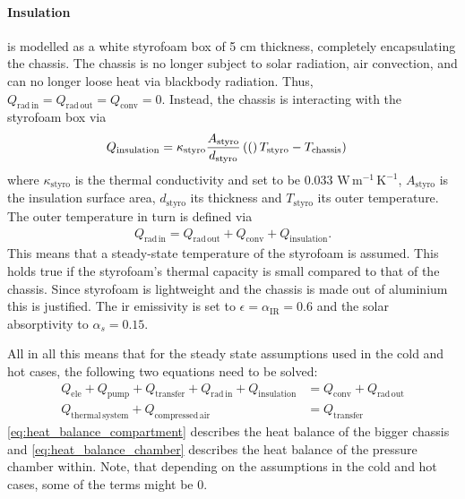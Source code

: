 \paragraph{Insulation} is modelled as a white styrofoam box of 5 cm thickness, completely encapsulating the chassis. The chassis is no longer subject to solar radiation, air convection, and can no longer loose heat via blackbody radiation. Thus, $Q_\mathrm{rad\,in}=Q_\mathrm{rad\,out}=Q_\mathrm{conv}=0$. Instead, the chassis is interacting with the styrofoam box via 
\begin{align}
    Q_\mathrm{insulation}=\kappa_\mathrm{styro}\frac{A_\mathrm{styro}}{d_\mathrm{styro}}\left( ( \right)T_\mathrm{styro}-T_\mathrm{chassis})\quad
\end{align} 
where $\kappa_\mathrm{styro}$ is the thermal conductivity and set to be 0.033 $\mathrm{W\,m^{-1}\,K^{-1}}$, $A_\mathrm{styro}$ is the insulation surface area, $d_\mathrm{styro}$ its thickness and $T_\mathrm{styro}$ its outer temperature. The outer temperature in turn is defined via 
\begin{align}
    Q_\mathrm{rad\,in} = Q_\mathrm{rad\,out}+Q_\mathrm{conv} + Q_\mathrm{insulation}.
\end{align}
This means that a steady-state temperature of the styrofoam is assumed. This holds true if the styrofoam's thermal capacity is small compared to that of the chassis. Since styrofoam is lightweight and the chassis is made out of aluminium this is justified.
The \gls{ir} emissivity is set to $\epsilon=\alpha_\mathrm{IR}=0.6$ and the solar absorptivity to $\alpha_s=0.15$.\par 

All in all this means that for the steady state assumptions used in the cold and hot cases, the following two equations need to be solved:
\begin{align}
    Q_\mathrm{ele}+Q_\mathrm{pump}+Q_\mathrm{transfer} + Q_\mathrm{rad\,in} + Q_\mathrm{insulation} &= Q_\mathrm{conv} + Q_\mathrm{rad\,out} \label{eq:heat_balance_compartment}\\ 
    Q_\mathrm{thermal\,system}+Q_\mathrm{compressed\,air} &=  Q_\mathrm{transfer} \label{eq:heat_balance_chamber}
\end{align} 
\eqref{eq:heat_balance_compartment} describes the heat balance of the bigger chassis and \eqref{eq:heat_balance_chamber} describes the heat balance of the pressure chamber within. Note, that depending on the assumptions in the cold and hot cases, some of the terms might be 0.